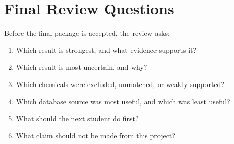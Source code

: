 \section{Final Review Questions}
Before the final package is accepted, the review asks:
\begin{enumerate}
  \item Which result is strongest, and what evidence supports it?
  \item Which result is most uncertain, and why?
  \item Which chemicals were excluded, unmatched, or weakly supported?
  \item Which database source was most useful, and which was least useful?
  \item What should the next student do first?
  \item What claim should not be made from this project?
\end{enumerate}
